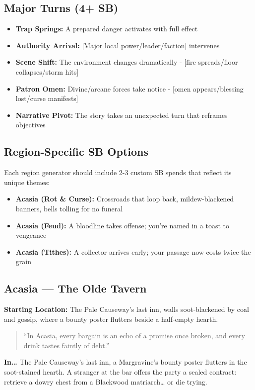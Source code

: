 \subsection*{Major Turns (4+ SB)}
\begin{itemize}
\item \textbf{Trap Springs:} A prepared danger activates with full effect
\item \textbf{Authority Arrival:} [Major local power/leader/faction] intervenes
\item \textbf{Scene Shift:} The environment changes dramatically - [fire spreads/floor collapses/storm hits]
\item \textbf{Patron Omen:} Divine/arcane forces take notice - [omen appears/blessing lost/curse manifests]
\item \textbf{Narrative Pivot:} The story takes an unexpected turn that reframes objectives
\end{itemize}

\subsection*{Region-Specific SB Options}
Each region generator should include 2-3 custom SB spends that reflect its unique themes:

\begin{itemize}
\item \textbf{Acasia (Rot \& Curse):} Crossroads that loop back, mildew-blackened banners, bells tolling for no funeral
\item \textbf{Acasia (Feud):} A bloodline takes offense; you're named in a toast to vengeance
\item \textbf{Acasia (Tithes):} A collector arrives early; your passage now costs twice the grain
\end{itemize}

\subsection*{Acasia — The Olde Tavern}
\textbf{Starting Location:} The Pale Causeway’s last inn, walls soot‑blackened by coal and gossip, where a bounty poster flutters beside a half‑empty hearth.
\begin{quote}
“In Acasia, every bargain is an echo of a promise once broken, and every drink tastes faintly of debt.”
\end{quote}

\textbf{In…} The Pale Causeway's last inn, a Margravine's bounty poster flutters in the soot-stained hearth. A stranger at the bar offers the party a sealed contract: retrieve a dowry chest from a Blackwood matriarch… or die trying.
